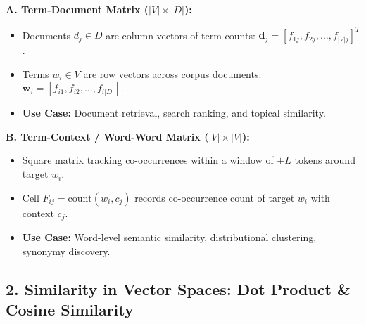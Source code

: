 \documentclass[10pt,a4paper]{article}
\begin{document}
\noindent\begin{minipage}[t]{0.485\textwidth}
\textbf{A. Term-Document Matrix ($|V| \times |D|$):}
\begin{itemize}[leftmargin=10pt,topsep=1pt,itemsep=1pt]
    \footnotesize
    \item Documents $d_j \in D$ are column vectors of term counts: $\mathbf{d}_j = [f_{1j}, f_{2j}, \dots, f_{|V|j}]^T$.
    \item Terms $w_i \in V$ are row vectors across corpus documents: $\mathbf{w}_i = [f_{i1}, f_{i2}, \dots, f_{i|D|}]$.
    \item \textbf{Use Case:} Document retrieval, search ranking, and topical similarity.
\end{itemize}
\end{minipage}\hfill
\begin{minipage}[t]{0.485\textwidth}
\textbf{B. Term-Context / Word-Word Matrix ($|V| \times |V|$):}
\begin{itemize}[leftmargin=10pt,topsep=1pt,itemsep=1pt]
    \footnotesize
    \item Square matrix tracking co-occurrences within a window of $\pm L$ tokens around target $w_i$.
    \item Cell $F_{ij} = \text{count}(w_i, c_j)$ records co-occurrence count of target $w_i$ with context $c_j$.
    \item \textbf{Use Case:} Word-level semantic similarity, distributional clustering, synonymy discovery.
\end{itemize}
\end{minipage}

\vspace{1pt}
\subsection*{\color{themeblue} 2. Similarity in Vector Spaces: Dot Product \& Cosine Similarity}
\vspace{-2pt}
\end{document}
